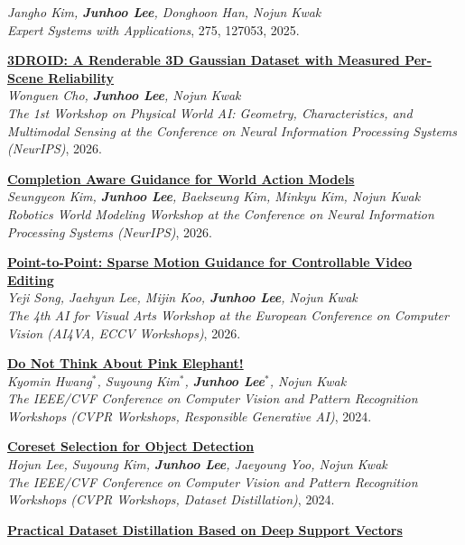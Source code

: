 \documentclass[10pt, letterpaper]{article}
\newcommand{\myname}{\textbf{\textup{Junhoo Lee}}}
\newcommand{\pubid}[1]{\textbf{[#1]}}
\newenvironment{publicationlist}{
    \begin{description}[leftmargin=4.0em, labelwidth=3.2em, labelsep=0.6em, itemsep=0.85mm, topsep=0.5mm, style=multiline, font=\normalfont]
}{
    \end{description}
}
\begin{document}
{\begin{publicationlist}
    \textit{Jangho Kim, \myname, Donghoon Han, Nojun Kwak} \\
    \textit{Expert Systems with Applications}, 275, 127053, 2025.
    \item[\pubid{W1}] \textbf{\href{https://arxiv.org/abs/2610.01744}{3DROID: A Renderable 3D Gaussian Dataset with Measured Per-Scene Reliability}} \\
    \textit{Wonguen Cho, \myname, Nojun Kwak} \\
    \textit{The 1st Workshop on Physical World AI: Geometry, Characteristics, and Multimodal Sensing at the Conference on Neural Information Processing Systems (NeurIPS)}, 2026.
    \item[\pubid{W2}] \textbf{\href{https://arxiv.org/abs/2610.01559}{Completion Aware Guidance for World Action Models}} \\
    \textit{Seungyeon Kim, \myname, Baekseung Kim, Minkyu Kim, Nojun Kwak} \\
    \textit{Robotics World Modeling Workshop at the Conference on Neural Information Processing Systems (NeurIPS)}, 2026.
    \item[\pubid{W3}] \textbf{\href{https://arxiv.org/abs/2511.18277}{Point-to-Point: Sparse Motion Guidance for Controllable Video Editing}} \\
    \textit{Yeji Song, Jaehyun Lee, Mijin Koo, \myname, Nojun Kwak} \\
    \textit{The 4th AI for Visual Arts Workshop at the European Conference on Computer Vision (AI4VA, ECCV Workshops)}, 2026.
    \item[\pubid{W4}] \textbf{\href{https://arxiv.org/abs/2404.15154}{Do Not Think About Pink Elephant!}} \\
    \textit{Kyomin Hwang$^*$, Suyoung Kim$^*$, \textbf{Junhoo Lee}$^*$, Nojun Kwak} \\
    \textit{The IEEE/CVF Conference on Computer Vision and Pattern Recognition Workshops (CVPR Workshops, Responsible Generative AI)}, 2024.
    \item[\pubid{W5}] \textbf{\href{https://arxiv.org/abs/2404.09161}{Coreset Selection for Object Detection}} \\
    \textit{Hojun Lee, Suyoung Kim, \myname, Jaeyoung Yoo, Nojun Kwak} \\
    \textit{The IEEE/CVF Conference on Computer Vision and Pattern Recognition Workshops (CVPR Workshops, Dataset Distillation)}, 2024.
    \item[\pubid{W6}] \textbf{\href{https://arxiv.org/abs/2405.00348}{Practical Dataset Distillation Based on Deep Support Vectors}} \\

\end{publicationlist}}
\end{document}
